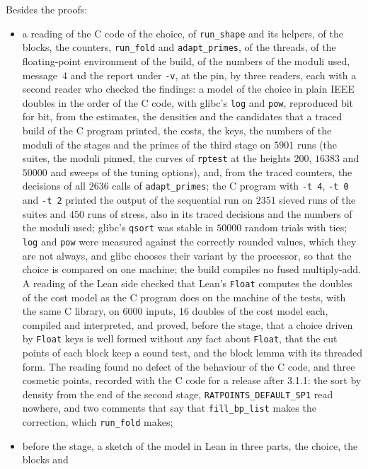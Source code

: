 Besides the proofs:
\begin{itemize}
  \item a reading of the C code of the choice, of \verb|run_shape| and its helpers, of the blocks,
    the counters, \verb|run_fold| and \verb|adapt_primes|, of the threads, of the floating-point
    environment of the build, of the numbers of the moduli used, message~4 and the report under
    \verb|-v|, at the pin, by three readers, each with a second reader who checked the findings: a
    model of the choice in plain IEEE doubles in the order of the C code, with glibc's \verb|log|
    and \verb|pow|, reproduced bit for bit, from the estimates, the densities and the candidates
    that a traced build of the C program printed, the costs, the keys, the numbers of the moduli of
    the stages and the primes of the third stage on $5901$ runs (the suites, the moduli pinned, the
    curves of \verb|rptest| at the heights $200$, $16383$ and $50000$ and sweeps of the tuning
    options), and, from the traced counters, the decisions of all $2636$ calls of
    \verb|adapt_primes|; the C program with \verb|-t 4|, \verb|-t 0| and \verb|-t 2| printed the
    output of the sequential run on $2351$ sieved runs of the suites and $450$ runs of stress, also
    in its traced decisions and the numbers of the moduli used; glibc's \verb|qsort| was stable in
    $50000$ random trials with ties; \verb|log| and \verb|pow| were measured against the correctly
    rounded values, which they are not always, and glibc chooses their variant by the processor, so
    that the choice is compared on one machine; the build compiles no fused multiply-add. A reading
    of the Lean side checked that Lean's \verb|Float| computes the doubles of the cost model as the
    C program does on the machine of the tests, with the same C library, on $6000$ inputs, $16$
    doubles of the cost model each, compiled and interpreted, and proved, before the stage, that a
    choice driven by \verb|Float| keys is well formed without any fact about \verb|Float|, that the
    cut points of each block keep a sound test, and the block lemma with its threaded form. The
    reading found no defect of the behaviour of the C code, and three cosmetic points, recorded with
    the C code for a release after 3.1.1: the sort by density from the end of the second stage,
    \verb|RATPOINTS_DEFAULT_SP1| read nowhere, and two comments that say that \verb|fill_bp_list|
    makes the correction, which \verb|run_fold| makes;
  \item before the stage, a sketch of the model in Lean in three parts, the choice, the blocks and

\end{itemize}
